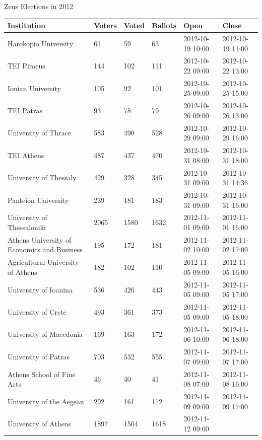 \documentclass[utf8]{beamer}
\begin{document}
\begin{frame}{Zeus Elections in 2012}

{\tiny
\begin{table}[t]
  \begin{tabular}{p{4cm}lllll}
    \hline
    Institution & Voters & Voted & Ballots & Open & Close\\
    \hline
    Harokopio University & 61 & 59 & 63 & 2012-10-19 10:00 & 2012-10-19 11:00\\
    TEI Piraeus & 144 & 102 & 111 & 2012-10-22 09:00 & 2012-10-22 13:00\\
    Ionian University & 105 & 92 & 101 & 2012-10-25 09:00 & 2012-10-25 15:00\\
    TEI Patras & 93 & 78 & 79 & 2012-10-26 09:00 & 2012-10-26 13:00\\
    University of Thrace & 583 & 490 & 528 & 2012-10-29 09:00 & 
    2012-10-29 16:00\\
    TEI Athens & 487 & 437 & 470 & 2012-10-31 08:00 & 2012-10-31 18:00\\
    University of Thessaly & 429 & 328 & 345 & 2012-10-31 09:00 & 
    2012-10-31 14:36\\
    Panteion University & 239 & 181 & 183 & 2012-10-31 09:00 & 
    2012-10-31 16:00\\
    University of Thessaloniki & 2065 & 1580 & 1632 & 2012-11-01 09:00 
    & 2012-11-01 16:00\\
    Athens University of Economics and Business & 195 & 172 & 181 & 
    2012-11-02 10:00 & 2012-11-02 17:00\\
    Agricultural University of Athens & 182 & 102 & 110 
    & 2012-11-05 09:00 & 2012-11-05 16:00\\
    University of Ioanina & 536 & 426 & 443 & 2012-11-05 09:00 &
    2012-11-05 17:00\\
    University of Crete & 493 & 361 & 373 & 2012-11-05 09:00 & 
    2012-11-05 18:00\\
    University of Macedonia & 169 & 163 & 172 & 2012-11-06 10:00 & 
    2012-11-06 18:00\\
    University of Patras & 703 & 532 & 555 & 2012-11-07 09:00 & 
    2012-11-07 17:00\\
    Athens School of Fine Arts & 46 & 40 & 41 & 2012-11-08 07:00 & 
    2012-11-08 16:00\\
    University of the Aegean & 292 & 161 & 172 & 2012-11-09 09:00 & 
    2012-11-09 17:00\\
    University of Athens & 1897 & 1504 & 1618 & 2012-11-12 09:00 & 

\end{tabular}
\end{table}}
\end{frame}
\end{document}
